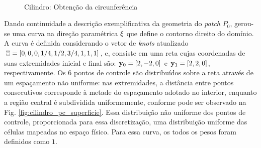 \documentclass[tese_patricia]{subfiles}
\begin{document}
\begin{figure}[!t]
	 \\ 
	\caption{Cilindro: Obtenção da circunferência}
	\label{fig:cilindro_geo0}
\end{figure}


Dando continuidade a descrição exemplificativa da geometria do \textit{patch} $P_0$, gerou-se uma curva na direção paramétrica $\xi$ que define o contorno direito do domínio. A curva é definida considerando o vetor de \textit{knots} atualizado $\Xi=\left[0,0,0,1/4,1/2,3/4,1,1,1\right]$, e,  consiste em uma reta cujas coordenadas de suas extremidades inicial e final são: $\mathbf{y}_0 =[2,-2,0]$ e $\mathbf{y}_1 =[2, 2 ,0]$, respectivamente. Os $6$ pontos de controle são distribuídos sobre a reta através de um espaçamento não uniforme: nas extremidades, a distância entre pontos consecutivos corresponde à metade do espaçamento adotado no interior, enquanto a região central é subdividida uniformemente, conforme pode ser observado na Fig. \ref{fig:cilindro_pc_superficie}. Essa distribuição não uniforme dos pontos de controle, proporcionada para essa discretização, uma distribuição uniforme das células mapeadas no espaço físico. Para essa curva, os todos os pesos foram definidos como $1$.
\end{document}

